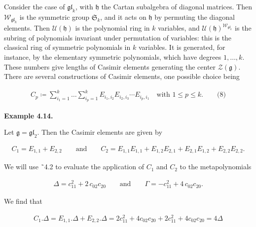 Consider the case of $\mathfrak{gl}_{k}$, with $\mathfrak{h}$ the Cartan subalgebra of diagonal matrices. Then $\mathcal{W}_{\mathfrak{gl}_{k}}$ is the symmetric group $\mathfrak{S}_{k}$, and it acts on $\mathfrak{h}$ by permuting the diagonal elements. Then $\mathcal{U}(\mathfrak{h})$ is the polynomial ring in $k$ variables, and $\mathcal{U}(\mathfrak{h})^{\mathcal{W}_{\mathfrak{gl}_{k}}}$ is the subring of polynomials invariant under permutation of variables: this is the classical ring of symmetric polynomials in $k$ variables. It is generated, for instance, by the elementary symmetric polynomials, which have degrees $1,\ldots,k$. These numbers give lengths of Casimir elements generating the center $\mathcal{Z}(\mathfrak{g})$.
There are several constructions of Casimir elements, one possible choice being



\[\begin{aligned}
\displaystyle C_{p}\coloneqq\sum_{i_{1}=1}^{k}\dots\sum_{i_{p}=1}^{k}E_{i_{1},i_{2}}E_{i_{2},i_{3}}\cdots E_{i_{p},i_{1}}\quad\text{with }1\leq p\leq k.\qquad\text{(8)}
\end{aligned}\]




\par\medskip\noindent\textbf{Example 4.14.}\par



Let $\mathfrak{g}=\mathfrak{gl}_{2}$. Then the Casimir elements are given by



\[\begin{aligned}
\displaystyle C_{1}=E_{1,1}+E_{2,2}\qquad\text{and}\qquad C_{2}=E_{1,1}E_{1,1}+E_{1,2}E_{2,1}+E_{2,1}E_{1,2}+E_{2,2}E_{2,2}.
\end{aligned}\]


We will use ˜4.2 to evaluate the application of $C_{1}$ and $C_{2}$ to the metapolynomials



\[\begin{aligned}
\displaystyle\Delta=c_{11}^{2}+2\,c_{02}c_{20}\qquad\text{and}\qquad\Gamma=-c_{11}^{2}+4\,c_{02}c_{20}.
\end{aligned}\]


We find that



\[\begin{aligned}
\displaystyle C_{1}.\Delta=E_{1,1}.\Delta+E_{2,2}.\Delta=2c_{11}^{2}+4c_{02}c_{20}+2c_{11}^{2}+4c_{02}c_{20}=4\Delta
\end{aligned}\]


